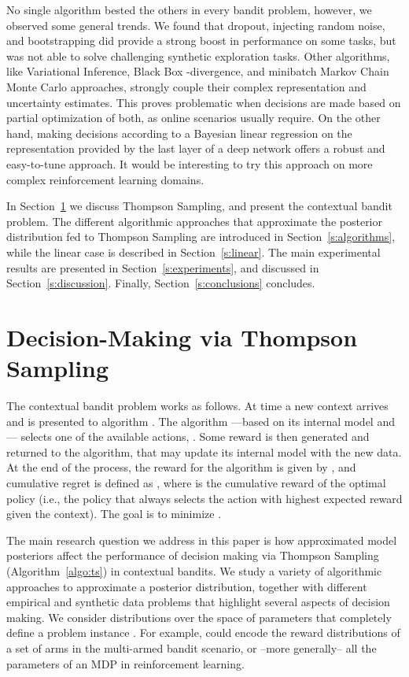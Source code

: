 \documentclass{article} \usepackage{iclr2018_conference,times}
\begin{document}
No single algorithm bested the others in every bandit problem, however, we observed some general trends. We found that dropout, injecting random noise, and bootstrapping did provide a strong boost in performance on some tasks, but was not able to solve challenging synthetic exploration tasks. Other algorithms, like Variational Inference, Black Box -divergence, and minibatch Markov Chain Monte Carlo approaches, strongly couple their complex representation and uncertainty estimates. This proves problematic when decisions are made based on partial optimization of both, as online scenarios usually require. On the other hand, making decisions according to a Bayesian linear regression on the representation provided by the last layer of a deep network offers a robust and easy-to-tune approach. It would be interesting to try this approach on more complex reinforcement learning domains.

In Section~\ref{s:problem} we discuss Thompson Sampling, and present the contextual bandit problem. The different algorithmic approaches that approximate the posterior distribution fed to Thompson Sampling are introduced in Section~\ref{s:algorithms}, while the linear case is described in Section~\ref{s:linear}. The main experimental results are presented in Section~\ref{s:experiments}, and discussed in Section~\ref{s:discussion}. Finally, Section~\ref{s:conclusions} concludes. \section{Decision-Making via Thompson Sampling}\label{s:problem}
The contextual bandit problem works as follows.  At time  a new context  arrives and is presented to algorithm .  The algorithm ---based on its internal model and --- selects one of the  available actions, .  Some reward  is then generated and returned to the algorithm, that may update its internal model with the new data.
At the end of the process, the reward for the algorithm is given by , and cumulative regret is defined as , where  is the cumulative reward of the optimal policy (i.e., the policy that always selects the action with highest expected reward given the context).
The goal is to minimize .

The main research question we address in this paper is how approximated model posteriors affect the performance of decision making via Thompson Sampling (Algorithm~\ref{algo:ts}) in contextual bandits.
We study a variety of algorithmic approaches to approximate a posterior distribution, together with different empirical and synthetic data problems that highlight several aspects of decision making.
We consider distributions  over the space of parameters that completely define a problem instance .
For example,  could encode the reward distributions of a set of arms in the multi-armed bandit scenario, or --more generally-- all the parameters of an MDP in reinforcement learning.
\end{document}
